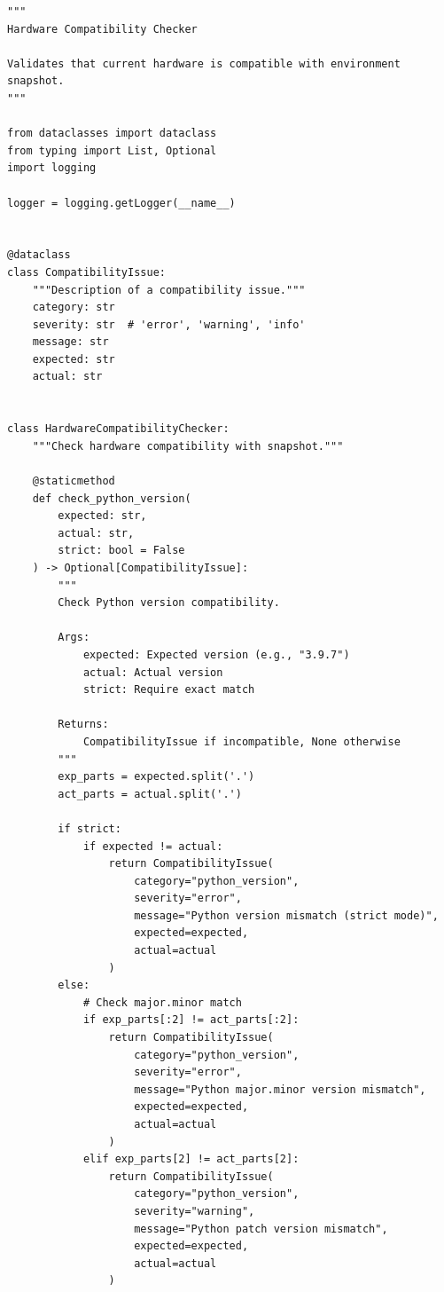 \begin{lstlisting}[style=python, caption={Hardware compatibility checking}]
"""
Hardware Compatibility Checker

Validates that current hardware is compatible with environment snapshot.
"""

from dataclasses import dataclass
from typing import List, Optional
import logging

logger = logging.getLogger(__name__)


@dataclass
class CompatibilityIssue:
    """Description of a compatibility issue."""
    category: str
    severity: str  # 'error', 'warning', 'info'
    message: str
    expected: str
    actual: str


class HardwareCompatibilityChecker:
    """Check hardware compatibility with snapshot."""

    @staticmethod
    def check_python_version(
        expected: str,
        actual: str,
        strict: bool = False
    ) -> Optional[CompatibilityIssue]:
        """
        Check Python version compatibility.

        Args:
            expected: Expected version (e.g., "3.9.7")
            actual: Actual version
            strict: Require exact match

        Returns:
            CompatibilityIssue if incompatible, None otherwise
        """
        exp_parts = expected.split('.')
        act_parts = actual.split('.')

        if strict:
            if expected != actual:
                return CompatibilityIssue(
                    category="python_version",
                    severity="error",
                    message="Python version mismatch (strict mode)",
                    expected=expected,
                    actual=actual
                )
        else:
            # Check major.minor match
            if exp_parts[:2] != act_parts[:2]:
                return CompatibilityIssue(
                    category="python_version",
                    severity="error",
                    message="Python major.minor version mismatch",
                    expected=expected,
                    actual=actual
                )
            elif exp_parts[2] != act_parts[2]:
                return CompatibilityIssue(
                    category="python_version",
                    severity="warning",
                    message="Python patch version mismatch",
                    expected=expected,
                    actual=actual
                )


\end{lstlisting}
